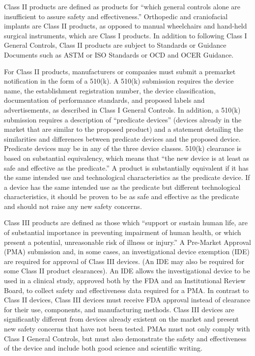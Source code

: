 \documentclass{article}
\begin{document}
Class II products are defined as products for ``which general controls
alone are insufficient to assure safety and effectiveness.'' Orthopedic
and craniofacial implants are Class II products, as opposed to manual
wheelchairs and hand-held surgical instruments, which are Class I
products.  In addition to following Class I General Controls, Class II
products are subject to Standards or Guidance Documents such as ASTM
or ISO Standards or OCD and OCER Guidance.

For Class II products, manufacturers or companies must submit a
premarket notification in the form of a 510(k). A 510(k) submission
requires the device name, the establishment registration number, the
device classification, documentation of performance standards, and
proposed labels and advertisements, as described in Class I General
Controls. In addition, a 510(k) submission requires a description of
``predicate devices'' (devices already in the market that are similar
to the proposed product) and a statement detailing the similarities
and differences between predicate devices and the proposed
device. Predicate devices may be in any of the three device
classes. 510(k) clearance is based on substantial equivalency, which
means that ``the new device is at least as safe and effective as the
predicate.'' A product is substantially equivalent if it has the same
intended use and technological characteristics as the predicate
device. If a device has the same intended use as the predicate but
different technological characteristics, it should be proven to be as
safe and effective as the predicate and should not raise any new
safety concerns.

Class III products are defined as those which ``support or sustain
human life, are of substantial importance in preventing impairment of
human health, or which present a potential, unreasonable risk of
illness or injury.'' A Pre-Market Approval (PMA) submission and, in
some cases, an investigational device exemption (IDE) are required for
approval of Class III devices. (An IDE may also be required for some
Class II product clearances). An IDE allows the investigational device
to be used in a clinical study, approved both by the FDA and an
Institutional Review Board, to collect safety and effectiveness data
required for a PMA.  In contrast to Class II devices, Class III
devices must receive FDA approval instead of clearance for their use,
components, and manufacturing methods. Class III devices are
significantly different from devices already existent on the market
and present new safety concerns that have not been tested. PMAs must
not only comply with Class I General Controls, but must also
demonstrate the safety and effectiveness of the device and include
both good science and scientific writing.
	 
\end{document}
